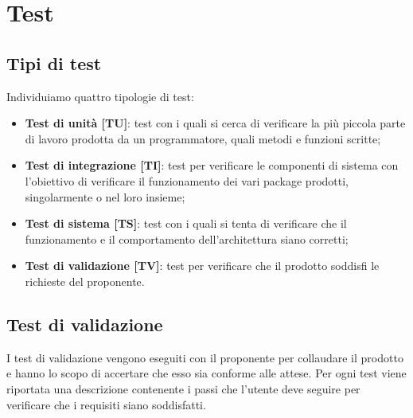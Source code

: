 





\section{Test}

\subsection{Tipi di test}
Individuiamo quattro tipologie di test:
\begin{itemize}
	\item \textbf{Test di unità [TU]}: test con i quali si cerca di verificare la più piccola parte di lavoro prodotta da un programmatore, quali metodi e funzioni scritte;
	\item \textbf{Test di integrazione [TI]}: test per verificare le componenti di sistema con l'obiettivo di verificare il funzionamento dei vari package prodotti, singolarmente o nel loro insieme;
	\item \textbf{Test di sistema [TS]}: test con i quali si tenta di verificare che il funzionamento e il comportamento dell'architettura siano corretti;
	\item \textbf{Test di validazione [TV]}: test per verificare che il prodotto soddisfi le richieste del proponente.
\end{itemize}



\subsection{Test di validazione}
I test di validazione vengono eseguiti con il proponente per collaudare il prodotto e hanno lo scopo di accertare che esso sia conforme alle attese. Per ogni test viene riportata una descrizione contenente i passi che l'utente deve seguire per verificare che i requisiti siano soddisfatti.

